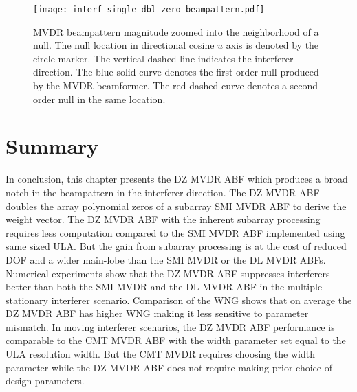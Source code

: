 \begin{figure}[!hp]
  \centering
  \texttt{[image: interf\_single\_dbl\_zero\_beampattern.pdf]}
  \caption{MVDR beampattern magnitude zoomed into the neighborhood of a
    null. The null location in directional cosine $u$ axis is denoted by
    the circle marker.  The vertical dashed line indicates the
    interferer direction. The blue solid curve denotes the first order
    null produced by the MVDR beamformer. The red dashed curve denotes
    a second order null in the same location.}
  \label{fig:mvdr-null-zero}
\end{figure}



\section{Summary}
\label{sec:dzmvdr-summary}
In conclusion, this chapter presents the DZ MVDR ABF which produces
a broad notch in the beampattern in the interferer direction. The DZ
MVDR ABF doubles the array polynomial zeros of a subarray SMI MVDR ABF
to derive the weight vector. The DZ MVDR ABF with the inherent
subarray processing requires less computation compared to the SMI MVDR
ABF implemented using same sized ULA. But the gain from subarray
processing is at the cost of reduced DOF and a wider main-lobe than the
SMI MVDR or the DL MVDR ABFs. Numerical experiments show that the DZ
MVDR ABF suppresses interferers better than both the SMI MVDR and the
DL MVDR ABF in the multiple stationary interferer scenario. Comparison
of the WNG shows that on average the DZ MVDR ABF has higher WNG making
it less sensitive to parameter mismatch. In moving interferer
scenarios, the DZ MVDR ABF performance is comparable to the CMT MVDR
ABF with the width parameter set equal to the ULA resolution
width. But the CMT MVDR requires choosing the width parameter while
the DZ MVDR ABF does not require making prior choice of design
parameters.

